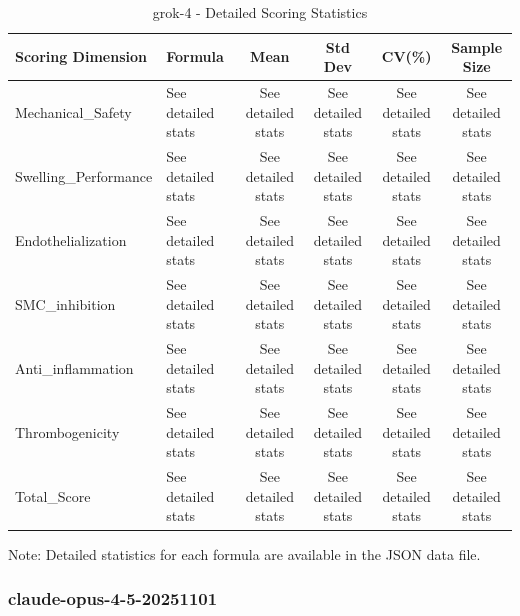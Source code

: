 \documentclass[12pt,a4paper]{article}
\begin{document}
\begin{table}[H]
\centering
\caption{grok-4 - Detailed Scoring Statistics}
\small
\begin{tabular}{llcccc}
\toprule
\textbf{Scoring Dimension} & \textbf{Formula} & \textbf{Mean} & \textbf{Std Dev} & \textbf{CV(\%)} & \textbf{Sample Size} \\
\midrule
Mechanical\_Safety & See detailed stats & See detailed stats & See detailed stats & See detailed stats & See detailed stats \\
Swelling\_Performance & See detailed stats & See detailed stats & See detailed stats & See detailed stats & See detailed stats \\
Endothelialization & See detailed stats & See detailed stats & See detailed stats & See detailed stats & See detailed stats \\
SMC\_inhibition & See detailed stats & See detailed stats & See detailed stats & See detailed stats & See detailed stats \\
Anti\_inflammation & See detailed stats & See detailed stats & See detailed stats & See detailed stats & See detailed stats \\
Thrombogenicity & See detailed stats & See detailed stats & See detailed stats & See detailed stats & See detailed stats \\
Total\_Score & See detailed stats & See detailed stats & See detailed stats & See detailed stats & See detailed stats \\
\bottomrule
\end{tabular}
\end{table}

Note: Detailed statistics for each formula are available in the JSON data file.

\subsubsection{claude-opus-4-5-20251101}
\end{document}
